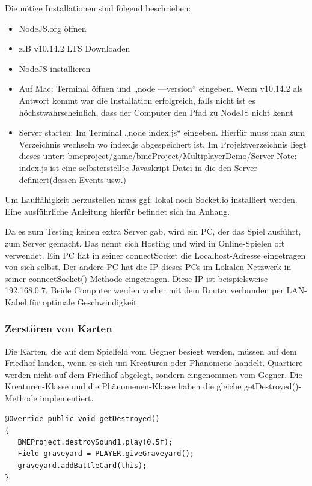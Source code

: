 Die nötige Installationen sind folgend beschrieben:
\begin{itemize}
\item NodeJS.org öffnen
\item z.B v10.14.2 LTS Downloaden
\item NodeJS installieren
\item Auf Mac: Terminal öffnen und „node —version“ eingeben. Wenn v10.14.2 als Antwort kommt
war die Installation erfolgreich, falls nicht ist es höchstwahrscheinlich, dass der Computer den
Pfad zu NodeJS nicht kennt
\item Server starten: Im Terminal „node index.js“ eingeben. Hierfür muss man zum Verzeichnis
wechseln wo index.js abgespeichert ist. Im Projektverzeichnis liegt dieses unter: bmeproject/game/bmeProject/MultiplayerDemo/Server
Note: index.js ist eine selbsterstellte Javaskript-Datei in die den Server definiert(dessen Events usw.)
\end{itemize}
Um Lauffähigkeit herzustellen muss ggf. lokal noch Socket.io installiert werden. Eine ausführliche Anleitung hierfür befindet sich im Anhang. 

Da es zum Testing keinen extra Server gab, wird ein PC, der das Spiel ausführt, zum Server gemacht. Das nennt sich Hosting und wird in Online-Spielen oft verwendet. Ein PC hat in seiner connectSocket die Localhost-Adresse eingetragen von sich selbst. Der andere PC hat die IP dieses PCs im Lokalen Netzwerk in seiner connectSocket()-Methode eingetragen. Diese IP ist beispielsweise 192.168.0.7. Beide Computer werden vorher mit dem Router verbunden per LAN-Kabel für optimale Geschwindigkeit.

\subsubsection{Zerstören von Karten}
Die Karten, die auf dem Spielfeld vom Gegner besiegt werden, müssen auf dem Friedhof landen, wenn es sich um Kreaturen oder Phänomene handelt. Quartiere werden nicht auf dem Friedhof abgelegt, sondern eingenommen vom Gegner. Die Kreaturen-Klasse und die Phänomenen-Klasse haben die gleiche getDestroyed()-Methode implementiert.

\begin{lstlisting}
@Override public void getDestroyed()
{
   BMEProject.destroySound1.play(0.5f);
   Field graveyard = PLAYER.giveGraveyard();
   graveyard.addBattleCard(this);
}
\end{lstlisting}

